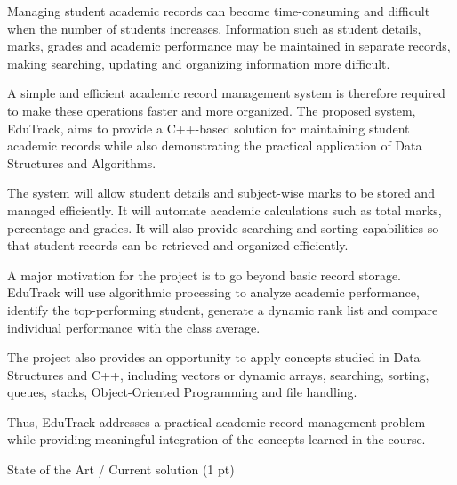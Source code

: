 \documentclass[11pt,a4paper]{article}
\newcommand{\blueheading}[1]{%
  {\sffamily\color{TitleBlue}\fontsize{15}{18}\selectfont #1}%
}
\begin{document}
\vspace{3mm}
\begin{answerbox}
Managing student academic records can become time-consuming and difficult when the number of students increases. Information such as student details, marks, grades and academic performance may be maintained in separate records, making searching, updating and organizing information more difficult.

A simple and efficient academic record management system is therefore required to make these operations faster and more organized. The proposed system, EduTrack, aims to provide a C++-based solution for maintaining student academic records while also demonstrating the practical application of Data Structures and Algorithms.

The system will allow student details and subject-wise marks to be stored and managed efficiently. It will automate academic calculations such as total marks, percentage and grades. It will also provide searching and sorting capabilities so that student records can be retrieved and organized efficiently.

A major motivation for the project is to go beyond basic record storage. EduTrack will use algorithmic processing to analyze academic performance, identify the top-performing student, generate a dynamic rank list and compare individual performance with the class average.

The project also provides an opportunity to apply concepts studied in Data Structures and C++, including vectors or dynamic arrays, searching, sorting, queues, stacks, Object-Oriented Programming and file handling.

Thus, EduTrack addresses a practical academic record management problem while providing meaningful integration of the concepts learned in the course.
\end{answerbox}

\vspace{7mm}
\blueheading{State of the Art / Current solution (1 pt)}
\end{document}
